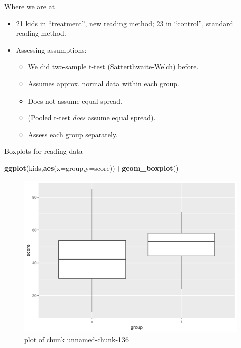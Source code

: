 \documentclass[ignorenonframetext,]{beamer}
\newenvironment{Shaded}{\begin{snugshade}}{\end{snugshade}}
\newcommand{\DataTypeTok}[1]{\textcolor[rgb]{0.13,0.29,0.53}{#1}}
\newcommand{\KeywordTok}[1]{\textcolor[rgb]{0.13,0.29,0.53}{\textbf{#1}}}
\newcommand{\NormalTok}[1]{#1}
\newcommand{\OperatorTok}[1]{\textcolor[rgb]{0.81,0.36,0.00}{\textbf{#1}}}
\providecommand{\tightlist}{%
  \setlength{\itemsep}{0pt}\setlength{\parskip}{0pt}}
\begin{document}
\begin{frame}{Where we are at}
\protect\hypertarget{where-we-are-at}{}

\begin{itemize}
\item
  21 kids in ``treatment'', new reading method; 23 in ``control'',
  standard reading method.
\item
  Assessing assumptions:

  \begin{itemize}
  \tightlist
  \item
    We did two-sample t-test (Satterthwaite-Welch) before.
  \item
    Assumes approx. normal data within each group.
  \item
    Does not assume equal spread.
  \item
    (Pooled t-test \emph{does} assume equal spread).
  \item
    Assess each group separately.
  \end{itemize}
\end{itemize}

\end{frame}

\begin{frame}[fragile]{Boxplots for reading data}
\protect\hypertarget{boxplots-for-reading-data}{}

\begin{Shaded}
\begin{Highlighting}[]
\KeywordTok{ggplot}\NormalTok{(kids,}\KeywordTok{aes}\NormalTok{(}\DataTypeTok{x=}\NormalTok{group,}\DataTypeTok{y=}\NormalTok{score))}\OperatorTok{+}\KeywordTok{geom_boxplot}\NormalTok{()}
\end{Highlighting}
\end{Shaded}

\begin{figure}
\centering
\includegraphics{figure/unnamed-chunk-136-1.png}
\caption{plot of chunk unnamed-chunk-136}
\end{figure}

\end{frame}
\end{document}
